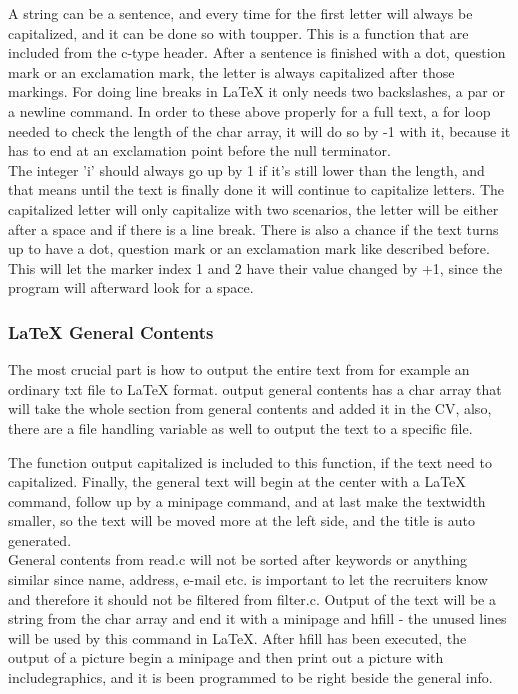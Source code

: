 A string can be a sentence, and every time for the first letter will always be capitalized,
and it can be done so with toupper.
This is a function that are included from the c-type header.
After a sentence is finished with a dot, question mark or an exclamation mark, 
the letter is always capitalized after those markings.
For doing line breaks in LaTeX it only needs two backslashes, a par or a newline command. 
In order to these above properly for a full text, a for loop needed to check the length of the char array,
it will do so by -1 with it, because it has to end at an exclamation point before the null terminator.\\

The integer 'i' should always go up by 1 if it's still lower than the length, 
and that means until the text is finally done 
it will continue to capitalize letters. The capitalized letter will only capitalize with two scenarios, 
the letter will be either after a space and if there is a line break.
There is also a chance if the text turns up to have a dot, question mark or an exclamation mark like described before.
This will let the marker index 1 and 2 have their value changed by +1, since the program will afterward look for a space.\\

\subsubsection{LaTeX General Contents}
The most crucial part is how to output the entire text from for example an ordinary txt file to LaTeX format.
output general contents has a char array that will take the whole section from general contents and added it in the CV,
also, there are a file handling variable as well to output the text to a specific file. 

The function output capitalized is included to this function, if the text need to capitalized.
Finally, the general text will begin at the center with a LaTeX command, follow up by a minipage command, 
and at last make the textwidth smaller, so the text will be moved more at the left side, and the title is auto generated. \\

General contents from read.c will not be sorted after keywords or anything similar 
since name, address, e-mail etc. is important to let the recruiters know and therefore it should not be filtered from filter.c.
Output of the text will be a string from the char array 
and end it with a minipage and hfill - the unused lines will be used by this command in LaTeX.
After hfill has been executed, the output of a picture begin a minipage 
and then print out a picture with includegraphics, and it is been programmed to be right beside the general info. 

